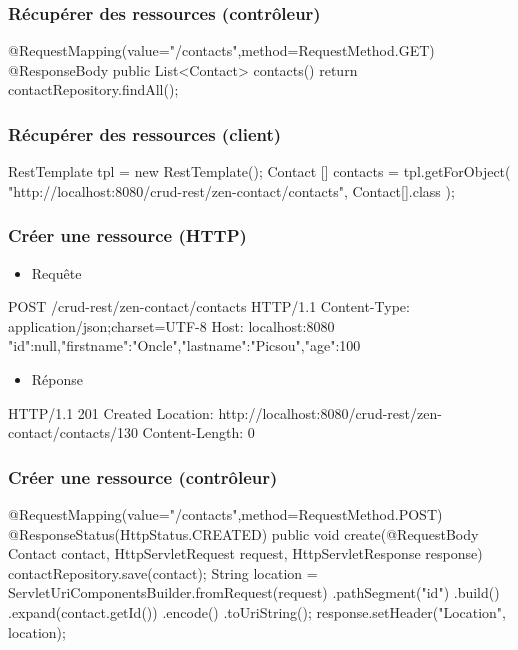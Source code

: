 \begin{frame}[fragile]
 \frametitle{Récupérer des ressources (contrôleur)}
 
 \begin{javacode}
@RequestMapping(value="/contacts",method=RequestMethod.GET)
@ResponseBody 
public List<Contact> contacts() {
  return contactRepository.findAll();
}
 \end{javacode}  

\end{frame}

\begin{frame}[fragile]
 \frametitle{Récupérer des ressources (client)}
 
 \begin{javacode}
RestTemplate tpl = new RestTemplate();
Contact [] contacts = tpl.getForObject(
  "http://localhost:8080/crud-rest/zen-contact/contacts", 
  Contact[].class
);
 \end{javacode}  

\end{frame}

\begin{frame}[fragile]
 \frametitle{Créer une ressource (HTTP)}
 
 \begin{itemize}
  \item Requête
 \end{itemize} 
 
 \begin{textcode}
POST /crud-rest/zen-contact/contacts HTTP/1.1
Content-Type: application/json;charset=UTF-8
Host: localhost:8080
{"id":null,"firstname":"Oncle","lastname":"Picsou","age":100}
 \end{textcode}
 
  \begin{itemize}
  \item Réponse
 \end{itemize} 
 
 \begin{textcode}
HTTP/1.1 201 Created
Location: http://localhost:8080/crud-rest/zen-contact/contacts/130
Content-Length: 0
 \end{textcode}

\end{frame}

\begin{frame}[fragile]
 \frametitle{Créer une ressource (contrôleur)}
 
 \begin{javacode}
@RequestMapping(value="/contacts",method=RequestMethod.POST)
@ResponseStatus(HttpStatus.CREATED)
public void create(@RequestBody Contact contact,
                   HttpServletRequest request, 
                   HttpServletResponse response) {
  contactRepository.save(contact);
  String location = ServletUriComponentsBuilder.fromRequest(request)
    .pathSegment("{id}")
    .build()
    .expand(contact.getId())
    .encode()
    .toUriString();
  response.setHeader("Location", location);
}
 \end{javacode}  

\end{frame}

